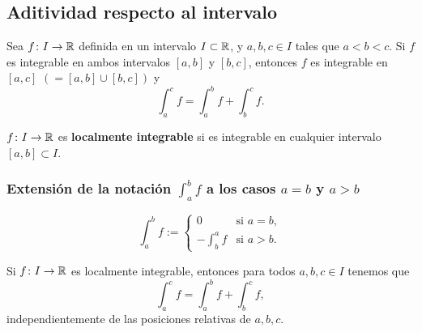 \documentclass[11pt,a4paper]{article}
\begin{document}

\subsection{Aditividad respecto al intervalo}

\begin{proposicion}
Sea $f\colon I\to\mathbb{R}$ definida en un intervalo $I\subset\mathbb{R}$, y $a,b,c\in I$ tales que $a<b<c$. Si $f$ es integrable en ambos intervalos $[a,b]$ y $[b,c]$, entonces $f$ es integrable en $[a,c]$ $(=[a,b]\cup[b,c])$ y
\[
  \int_a^c f=\int_a^b f+\int_b^c f.
\]
\end{proposicion}

\begin{definicion}
$f\colon I\to\mathbb{R}$ es \textbf{localmente integrable} si es integrable en cualquier intervalo $[a,b]\subset I$.
\end{definicion}

\subsubsection*{Extensión de la notación $\int_a^b f$ a los casos $a=b$ y $a>b$}

\[
  \int_a^b f:=\begin{cases}
    0 & \text{si } a=b,\\[4pt]
    -\displaystyle\int_b^a f & \text{si } a>b.
  \end{cases}
\]

\begin{proposicion}
Si $f\colon I\to\mathbb{R}$ es localmente integrable, entonces para todos $a,b,c\in I$ tenemos que
\[
  \int_a^c f=\int_a^b f+\int_b^c f,
\]
independientemente de las posiciones relativas de $a,b,c$.
\end{proposicion}
\end{document}
